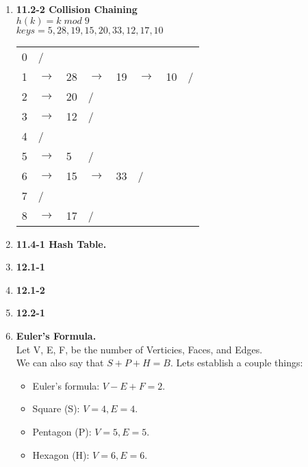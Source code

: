 \documentclass{article}
\begin{document}
\begin{enumerate}
    \item \textbf{11.2-2 Collision Chaining} \\
    
    $h(k) = k\;mod\;9$ \\
    $keys = 5, 28, 19, 15, 20, 33, 12, 17, 10$ \\

    \begin{table}[H]
      \begin{tabular}{l|l|llllll}
      \cline{2-2}
      0 & / & & & & & &  \\ \cline{2-8} 
      1 & $\rightarrow$ & \multicolumn{1}{l|}{28} & \multicolumn{1}{l|}{$\rightarrow$} & \multicolumn{1}{l|}{19} & \multicolumn{1}{l|}{$\rightarrow$} & \multicolumn{1}{l|}{10} & \multicolumn{1}{l|}{/} \\ \cline{2-8} 
      2 & $\rightarrow$ & \multicolumn{1}{l|}{20} & \multicolumn{1}{l|}{/}& & & &  \\ \cline{2-4}
      3 & $\rightarrow$ & \multicolumn{1}{l|}{12} & \multicolumn{1}{l|}{/}& & & &  \\ \cline{2-4}
      4 & / & & & & & &  \\ \cline{2-4}
      5 & $\rightarrow$ & \multicolumn{1}{l|}{5}  & \multicolumn{1}{l|}{/}& & & &  \\ \cline{2-6}
      6 & $\rightarrow$ & \multicolumn{1}{l|}{15} & \multicolumn{1}{l|}{$\rightarrow$} & \multicolumn{1}{l|}{33} & \multicolumn{1}{l|}{/}& &  \\ \cline{2-6}
      7 & / & & & & & &  \\ \cline{2-4}
      8 & $\rightarrow$ & \multicolumn{1}{l|}{17} & \multicolumn{1}{l|}{/}& & & &  \\ \cline{2-4}
      \end{tabular}
      \end{table}
    
    \item \textbf{11.4-1 Hash Table.}
    \item \textbf{12.1-1}
    \item \textbf{12.1-2}
    \item \textbf{12.2-1}
    \item \textbf{Euler's Formula.} \\
    
    Let V, E, F, be the number of Verticies, Faces, and Edges. \\
    We can also say that $S + P + H = B$.
    Lets establish a couple things: 
    \begin{itemize}
        \item Euler's formula: $V - E + F = 2$.
        \item Square (S): $V = 4, E = 4$.
        \item Pentagon (P): $V = 5, E = 5$.
        \item Hexagon (H): $V = 6, E = 6$.
    \end{itemize}


\end{enumerate}
\end{document}
